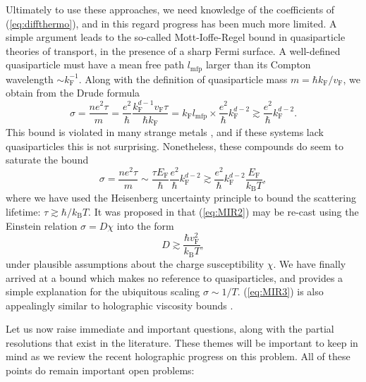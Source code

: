 \documentclass[10pt, oneside]{book}
\begin{document}
\begin{doublespace}
Ultimately to use these approaches, we need knowledge of the coefficients of (\ref{eq:diffthermo}), and in this regard progress has been much more limited.   A simple argument \cite{gunnarsson} leads to the so-called Mott-Ioffe-Regel bound in quasiparticle theories of transport, in the presence of a sharp Fermi surface.   A well-defined quasiparticle must have a mean free path $l_{\mathrm{mfp}}$ larger than its Compton wavelength $\sim k_{\mathrm{F}}^{-1}$.   Along with the definition of quasiparticle mass $m=\hbar k_{\mathrm{F}}/v_{\mathrm{F}}$, we obtain from the Drude formula \begin{equation}
\sigma = \frac{ne^2\tau}{m} = \frac{e^2}{\hbar} \frac{k_{\mathrm{F}}^{d-1}v_{\mathrm{F}}\tau}{\hbar k_{\mathrm{F}}} = k_{\mathrm{F}}l_{\mathrm{mfp}} \times \frac{e^2}{\hbar} k_{\mathrm{F}}^{d-2} \gtrsim \frac{e^2}{\hbar} k_{\mathrm{F}}^{d-2}.  \label{eq:MIRbound}
\end{equation}
This bound is violated in many strange metals \cite{gunnarsson}, and if these systems lack quasiparticles this is not surprising.   Nonetheless, these compounds do seem to saturate the bound \cite{Bruin2013} \begin{equation}
\sigma = \frac{ne^2\tau}{m} \sim \frac{\tau E_{\mathrm{F}}}{\hbar} \frac{e^2}{\hbar} k_{\mathrm{F}}^{d-2}  \gtrsim \frac{e^2}{\hbar} k_{\mathrm{F}}^{d-2} \frac{E_{\mathrm{F}}}{k_{\mathrm{B}}T},  \label{eq:MIR2}
\end{equation}
where we have used the Heisenberg uncertainty principle to bound the scattering lifetime:  $\tau \gtrsim \hbar/k_{\mathrm{B}}T$.  It was proposed in \cite{Hartnoll:2014lpa} that (\ref{eq:MIR2}) may be re-cast using the Einstein relation $\sigma = D\chi$ into the form \begin{equation}
D\gtrsim \frac{\hbar v_{\mathrm{F}}^2}{k_{\mathrm{B}}T},  \label{eq:MIR3}
\end{equation}
under plausible assumptions about the charge susceptibility $\chi$.   We have finally arrived at a bound which makes no reference to quasiparticles, and provides a simple explanation for the ubiquitous scaling $\sigma \sim 1/T$.  (\ref{eq:MIR3}) is also appealingly similar to holographic viscosity bounds \cite{Kovtun:2004de}. 

Let us now raise immediate and important questions, along with the partial resolutions that exist in the literature.   These themes will be important to keep in mind as we review the recent holographic progress on this problem.  All of these points do remain important open problems:


\end{doublespace}
\end{document}
